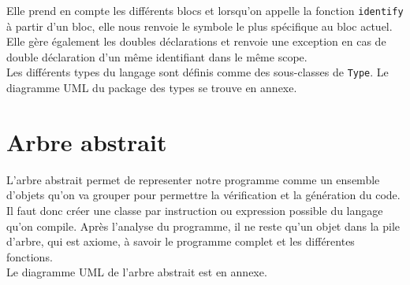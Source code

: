 \documentclass{article}
\begin{document}
Elle prend en compte les différents blocs et lorsqu'on appelle la fonction \verb+identify+ à partir d'un bloc, elle nous renvoie le symbole le plus spécifique au bloc actuel. \\

Elle gère également les doubles déclarations et renvoie une exception en cas de double déclaration d'un même identifiant dans le même scope. \\

Les différents types du langage sont définis comme des sous-classes de \verb+Type+. Le diagramme UML du package des types se trouve en annexe.
\section{Arbre abstrait}
L'arbre abstrait permet de representer notre programme comme un ensemble d'objets qu'on va grouper pour permettre la vérification et la génération du code.\\
Il faut donc créer une classe par instruction ou expression possible du langage qu'on compile. Après l'analyse du programme, il ne reste qu'un objet dans la pile d'arbre, qui est axiome, à savoir le programme complet et les différentes fonctions.\\
Le diagramme UML de l'arbre abstrait est en annexe.
\end{document}
